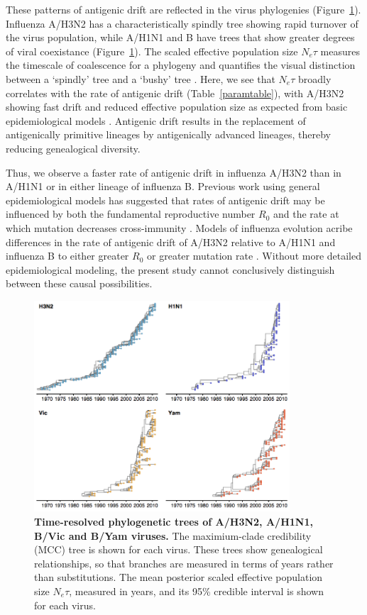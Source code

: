 \documentclass[11pt,oneside,letterpaper]{article}
\begin{document}
These patterns of antigenic drift are reflected in the virus phylogenies (Figure~\ref{trees}).
Influenza A/H3N2 has a characteristically spindly tree showing rapid turnover of the virus population, while A/H1N1 and B have trees that show greater degrees of viral coexistance (Figure~\ref{trees}).
The scaled effective population size $N_e \tau$ measures the timescale of coalescence for a phylogeny and quantifies the visual distinction between a `spindly' tree and a `bushy' tree \cite{Bedford11}.
Here, we see that $N_e \tau$ broadly correlates with the rate of antigenic drift (Table~\ref{paramtable}), with A/H3N2 showing fast drift and reduced effective population size as expected from basic epidemiological models \cite{Bedford12}.
Antigenic drift results in the replacement of antigenically primitive lineages by antigenically advanced lineages, thereby reducing genealogical diversity.

Thus, we observe a faster rate of antigenic drift in influenza A/H3N2 than in A/H1N1 or in either lineage of influenza B.
Previous work using general epidemiological models has suggested that rates of antigenic drift may be influenced by both the fundamental reproductive number $R_0$ and the rate at which mutation decreases cross-immunity \cite{Gog02,Lin03}.
Models of influenza evolution acribe differences in the rate of antigenic drift of A/H3N2 relative to A/H1N1 and influenza B to either greater $R_0$ or greater mutation rate \cite{Ferguson03,Bedford12}.
Without more detailed epidemiological modeling, the present study cannot conclusively distinguish between these causal possibilities.

\begin{figure}[h]
	\centering		
	\includegraphics[width=0.85\textwidth]{figures/trees}
	\caption{\textbf{Time-resolved phylogenetic trees of A/H3N2, A/H1N1, B/Vic and B/Yam viruses.} 
	The maximium-clade credibility (MCC) tree is shown for each virus.
	These trees show genealogical relationships, so that branches are measured in terms of years rather than substitutions.
	The mean posterior scaled effective population size $N_e \tau$, measured in years, and its 95\% credible interval is shown for each virus.} 
	\label{trees} 
\end{figure}
\end{document}
